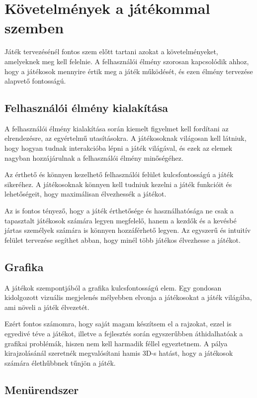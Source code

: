 \chapter{Követelmények a játékommal szemben}
Játék tervezésénél fontos szem előtt tartani azokat a követelményeket, amelyeknek meg kell felelnie. A felhasználói élmény szorosan kapcsolódik ahhoz, hogy a játékosok mennyire értik meg a játék működését, és ezen élmény tervezése alapvető fontosságú.


\section{Felhasználói élmény kialakítása}

A felhasználói élmény kialakítása során kiemelt figyelmet kell fordítani az elrendezésre, az egyértelmű utasításokra. A játékosoknak világosan kell látniuk, hogy hogyan tudnak interakcióba lépni a játék világával, és ezek az elemek nagyban hozzájárulnak a felhasználói élmény minőségéhez.

Az érthető és könnyen kezelhető felhasználói felület kulcsfontosságú a játék sikeréhez. A játékosoknak könnyen kell tudniuk kezelni a játék funkcióit és lehetőségeit, hogy maximálisan élvezhessék a játékot.

Az is fontos tényező, hogy a játék érthetősége és használhatósága ne csak a tapasztalt játékosok számára legyen megfelelő, hanem a kezdők és a kevésbé jártas személyek számára is könnyen hozzáférhető legyen. Az egyszerű és intuitív felület tervezése segíthet abban, hogy minél több játékos élvezhesse a játékot.


\section{Grafika}

A játékok szempontjából a grafika kulcsfontosságú elem. Egy gondosan kidolgozott vizuális megjelenés mélyebben elvonja a játékosokat a játék világába, ami növeli a játék élvezetét.

Ezért fontos számomra, hogy saját magam készítsem el a rajzokat, ezzel is egyedivé téve a játékot, illetve a fejlesztés során egyszerűbben áthidalhatóak a grafikai problémák, hiszen nem kell harmadik féllel egyeztetnem. A pálya kirajzolásánál szeretnék megvalósítani hamis 3D-s hatást, hogy a játékosok számára élethűbbnek tűnjön a játék. 


\section{Menürendszer}

